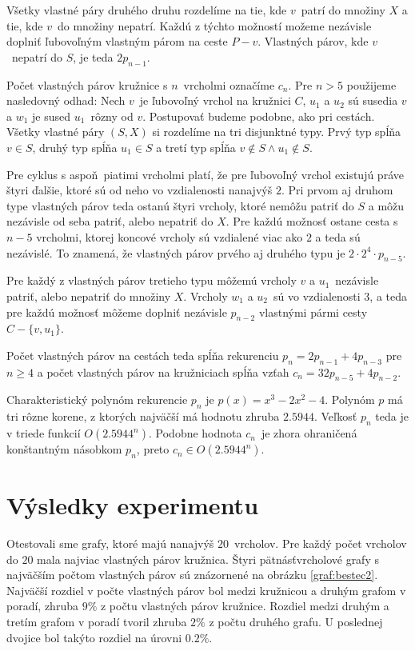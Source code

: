 Všetky vlastné páry druhého druhu rozdelíme na tie, kde $v$ patrí do množiny $X$ a tie, kde $v$ do množiny
nepatrí. Každú z týchto možností možeme nezávisle doplniť ľubovoľným vlastným párom na ceste $P - v$.
Vlastných párov, kde $v$ nepatrí do $S$, je teda $2p_{n-1}$.

Počet vlastných párov kružnice s $n$ vrcholmi označíme $c_n$. Pre $n > 5$ použijeme nasledovný odhad:
Nech $v$ je ľubovoľný vrchol na kružnici $C$, $u_1$ a $u_2$ sú susedia $v$ a $w_1$ je sused $u_1$ rôzny od $v$.
Postupovať budeme podobne, ako pri cestách. Všetky vlastné páry $(S,X)$ si rozdelíme na tri disjunktné
typy. Prvý typ spĺňa $v \in S$, druhý typ spĺňa $u_1 \in S$ a tretí typ spĺňa $v \notin S \wedge u_1 \notin S$.

Pre cyklus s aspoň piatimi vrcholmi platí, že pre ľubovoľný vrchol existujú práve štyri ďalšie, ktoré
sú od neho vo vzdialenosti nanajvýš $2$. Pri prvom aj druhom type vlastných párov teda ostanú
štyri vrcholy, ktoré nemôžu patriť do $S$ a môžu nezávisle od seba patriť, alebo nepatriť do $X$.
Pre každú možnosť ostane cesta s $n - 5$ vrcholmi, ktorej koncové vrcholy sú vzdialené viac ako $2$
a teda sú nezávislé. To znamená, že vlastných párov prvého aj druhého typu je $2 \cdot 2^4 \cdot p_{n-5}$.

Pre každý z vlastných párov tretieho typu môžemú vrcholy $v$ a $u_1$ nezávisle patriť, alebo nepatriť
do množiny $X$. Vrcholy $w_1$ a $u_2$ sú vo vzdialenosti $3$, a teda pre každú možnosť môžeme
doplniť nezávisle $p_{n-2}$ vlastnými pármi cesty $C - \{v, u_1\}$.

Počet vlastných párov na cestách teda spĺňa rekurenciu $p_n = 2p_{n-1} + 4p_{n-3}$ pre $n \ge 4$
a počet vlastných párov na kružniciach spĺňa vzťah $c_n = 32 p_{n-5} + 4p_{n-2}$.

Charakteristický polynóm rekurencie $p_n$ je $p(x) = x^3 - 2x^2 - 4$. Polynóm $p$ má tri rôzne
korene, z ktorých najväčší má hodnotu zhruba $2.5944$. Veľkosť $p_n$ teda je v triede funkcií
$O(2.5944^n)$. Podobne hodnota $c_n$ je zhora ohraničená konštantným násobkom $p_n$, preto
$c_n \in O(2.5944^n)$.

\section{Výsledky experimentu}

Otestovali sme grafy, ktoré majú nanajvýš $20$ vrcholov. Pre každý počet vrcholov do $20$ mala
najviac vlastných párov kružnica. Štyri pätnásťvrcholové grafy s najväčším počtom vlastných
párov sú znázornené na obrázku \ref{graf:bestec2}. Najväčší rozdiel v počte vlastných párov
bol medzi kružnicou a druhým grafom v poradí, zhruba $9\%$ z počtu vlastných párov kružnice.
Rozdiel medzi druhým a tretím grafom v poradí tvoril zhruba $2\%$ z počtu druhého grafu. U poslednej
dvojice bol takýto rozdiel na úrovni $0.2\%$.

